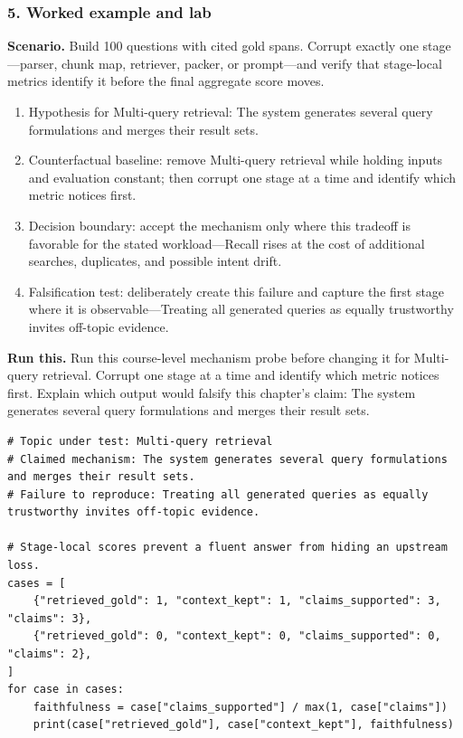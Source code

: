 \subsubsection*{5. Worked example and lab}
\textbf{Scenario.} Build 100 questions with cited gold spans. Corrupt exactly one stage—parser, chunk map, retriever, packer, or prompt—and verify that stage-local metrics identify it before the final aggregate score moves.
\begin{enumerate}
\item Hypothesis for Multi-query retrieval: The system generates several query formulations and merges their result sets.
\item Counterfactual baseline: remove Multi-query retrieval while holding inputs and evaluation constant; then corrupt one stage at a time and identify which metric notices first.
\item Decision boundary: accept the mechanism only where this tradeoff is favorable for the stated workload—Recall rises at the cost of additional searches, duplicates, and possible intent drift.
\item Falsification test: deliberately create this failure and capture the first stage where it is observable—Treating all generated queries as equally trustworthy invites off-topic evidence.
\end{enumerate}
\textbf{Run this.} Run this course-level mechanism probe before changing it for Multi-query retrieval. Corrupt one stage at a time and identify which metric notices first. Explain which output would falsify this chapter's claim: The system generates several query formulations and merges their result sets.
\begin{Verbatim}[fontsize=\scriptsize]
# Topic under test: Multi-query retrieval
# Claimed mechanism: The system generates several query formulations and merges their result sets.
# Failure to reproduce: Treating all generated queries as equally trustworthy invites off-topic evidence.

# Stage-local scores prevent a fluent answer from hiding an upstream loss.
cases = [
    {"retrieved_gold": 1, "context_kept": 1, "claims_supported": 3, "claims": 3},
    {"retrieved_gold": 0, "context_kept": 0, "claims_supported": 0, "claims": 2},
]
for case in cases:
    faithfulness = case["claims_supported"] / max(1, case["claims"])
    print(case["retrieved_gold"], case["context_kept"], faithfulness)
\end{Verbatim}
